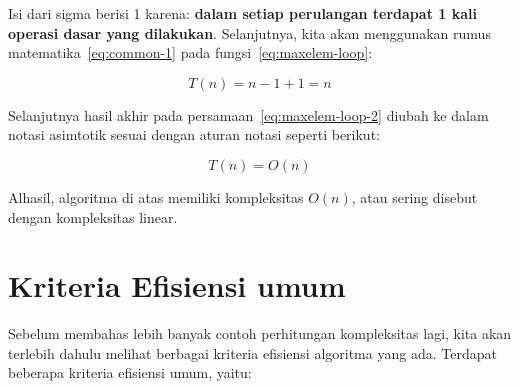 Isi dari sigma berisi 1 karena: \textbf{dalam setiap perulangan terdapat 1 kali operasi dasar yang dilakukan}. Selanjutnya, kita akan menggunakan rumus matematika~\ref{eq:common-1} pada fungsi~\ref{eq:maxelem-loop}:

\begin{equation}\label{eq:maxelem-loop-2}
T(n) = n - 1 + 1 = n
\end{equation}

Selanjutnya hasil akhir pada persamaan~\ref{eq:maxelem-loop-2} diubah ke dalam notasi asimtotik sesuai dengan aturan notasi seperti berikut:

$$
T(n) = O(n)
$$

Alhasil, algoritma di atas memiliki kompleksitas $O(n)$, atau sering disebut dengan kompleksitas linear.

\section{Kriteria Efisiensi umum}

Sebelum membahas lebih banyak contoh perhitungan kompleksitas lagi, kita akan terlebih dahulu melihat berbagai kriteria efisiensi algoritma yang ada. Terdapat beberapa kriteria efisiensi umum, yaitu:

